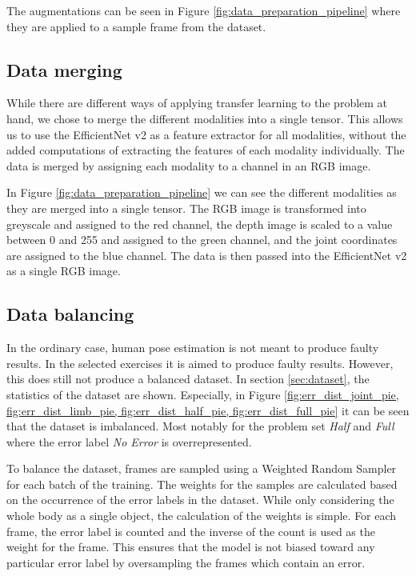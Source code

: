 The augmentations can be seen in Figure \ref{fig:data_preparation_pipeline} where they are applied to a sample frame from the dataset.

\subsection{Data merging}

While there are different ways of applying transfer learning to the problem at hand, we chose to merge the different modalities into a single tensor. This allows us to use the EfficientNet v2 as a feature extractor for all modalities, without the added computations of extracting the features of each modality individually. The data is merged by assigning each modality to a channel in an RGB image.

In Figure \ref{fig:data_preparation_pipeline} we can see the different modalities as they are merged into a single tensor. The RGB image is transformed into greyscale and assigned to the red channel, the depth image is scaled to a value between 0 and 255 and assigned to the green channel, and the joint coordinates are assigned to the blue channel. The data is then passed into the EfficientNet v2 as a single RGB image.

\subsection{Data balancing}

In the ordinary case, human pose estimation is not meant to produce faulty results. In the selected exercises it is aimed to produce faulty results. However, this does still not produce a balanced dataset. In section \ref{sec:dataset}, the statistics of the dataset are shown. Especially, in Figure \ref{fig:err_dist_joint_pie, fig:err_dist_limb_pie, fig:err_dist_half_pie, fig:err_dist_full_pie} it can be seen that the dataset is imbalanced. Most notably for the problem set \textit{Half} and \textit{Full} where the error label \textit{No Error} is overrepresented.

To balance the dataset, frames are sampled using a Weighted Random Sampler for each batch of the training. The weights for the samples are calculated based on the occurrence of the error labels in the dataset. While only considering the whole body as a single object, the calculation of the weights is simple. For each frame, the error label is counted and the inverse of the count is used as the weight for the frame. This ensures that the model is not biased toward any particular error label by oversampling the frames which contain an error.

